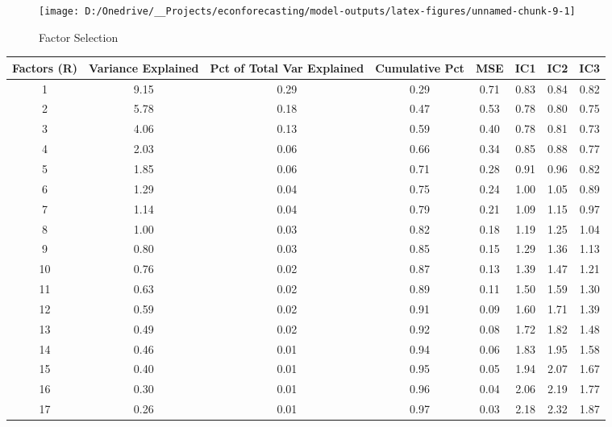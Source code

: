 \documentclass[11pt, letterpaper]{article}\usepackage[]{graphicx}\usepackage[]{color}
\begin{document}
\begin{figure}[H]

{\centering \texttt{[image: D:/Onedrive/\_\_Projects/econforecasting/model-outputs/latex-figures/unnamed-chunk-9-1]} 

}

\caption[Factor Selection]{Factor Selection}\label{fig:unnamed-chunk-9}
\end{figure}



\begin{table}[H]
\centering
\begingroup\scriptsize
\begin{tabular}{cccccccc}
  \hline
Factors (R) & Variance Explained & Pct of Total Var Explained & Cumulative Pct & MSE & IC1 & IC2 & IC3 \\ 
  \hline
  1 & 9.15 & 0.29 & 0.29 & 0.71 & 0.83 & 0.84 & 0.82 \\ 
    2 & 5.78 & 0.18 & 0.47 & 0.53 & 0.78 & 0.80 & 0.75 \\ 
    3 & 4.06 & 0.13 & 0.59 & 0.40 & 0.78 & 0.81 & 0.73 \\ 
    4 & 2.03 & 0.06 & 0.66 & 0.34 & 0.85 & 0.88 & 0.77 \\ 
    5 & 1.85 & 0.06 & 0.71 & 0.28 & 0.91 & 0.96 & 0.82 \\ 
    6 & 1.29 & 0.04 & 0.75 & 0.24 & 1.00 & 1.05 & 0.89 \\ 
    7 & 1.14 & 0.04 & 0.79 & 0.21 & 1.09 & 1.15 & 0.97 \\ 
    8 & 1.00 & 0.03 & 0.82 & 0.18 & 1.19 & 1.25 & 1.04 \\ 
    9 & 0.80 & 0.03 & 0.85 & 0.15 & 1.29 & 1.36 & 1.13 \\ 
   10 & 0.76 & 0.02 & 0.87 & 0.13 & 1.39 & 1.47 & 1.21 \\ 
   11 & 0.63 & 0.02 & 0.89 & 0.11 & 1.50 & 1.59 & 1.30 \\ 
   12 & 0.59 & 0.02 & 0.91 & 0.09 & 1.60 & 1.71 & 1.39 \\ 
   13 & 0.49 & 0.02 & 0.92 & 0.08 & 1.72 & 1.82 & 1.48 \\ 
   14 & 0.46 & 0.01 & 0.94 & 0.06 & 1.83 & 1.95 & 1.58 \\ 
   15 & 0.40 & 0.01 & 0.95 & 0.05 & 1.94 & 2.07 & 1.67 \\ 
   16 & 0.30 & 0.01 & 0.96 & 0.04 & 2.06 & 2.19 & 1.77 \\ 
   17 & 0.26 & 0.01 & 0.97 & 0.03 & 2.18 & 2.32 & 1.87 \\ 

\end{tabular}
\end{table}
\end{document}
